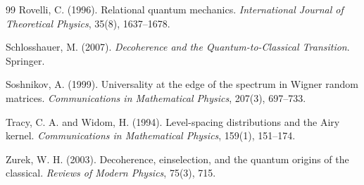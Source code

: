 \documentclass[11pt, openright, twoside]{book}
\theoremstyle{plain}
\theoremstyle{definition}
\theoremstyle{remark}
\begin{document}
\begin{thebibliography}{99}
Rovelli, C. (1996).
Relational quantum mechanics.
\textit{International Journal of Theoretical Physics}, 35(8), 1637--1678.

Schlosshauer, M. (2007).
\textit{Decoherence and the Quantum-to-Classical Transition}.
Springer.

Soshnikov, A. (1999).
Universality at the edge of the spectrum in Wigner random matrices.
\textit{Communications in Mathematical Physics}, 207(3), 697--733.

Tracy, C. A. and Widom, H. (1994).
Level-spacing distributions and the Airy kernel.
\textit{Communications in Mathematical Physics}, 159(1), 151--174.

Zurek, W. H. (2003).
Decoherence, einselection, and the quantum origins of the classical.
\textit{Reviews of Modern Physics}, 75(3), 715.

\end{thebibliography}
\end{document}

